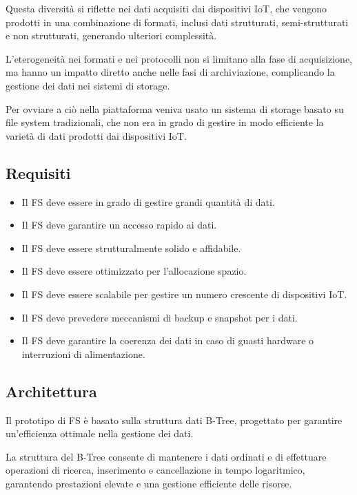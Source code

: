 \documentclass[12pt,a4paper,openright,twoside]{book}
\begin{document}
        Questa diversità si riflette nei dati acquisiti dai dispositivi \ac{IoT}, che vengono prodotti in una combinazione di formati, inclusi dati strutturati, semi-strutturati e non strutturati, generando ulteriori complessità.

        L'eterogeneità nei formati e nei protocolli non si limitano alla fase di acquisizione, ma hanno un impatto diretto anche nelle fasi di archiviazione, complicando la gestione dei dati nei sistemi di storage.

        Per ovviare a ciò nella piattaforma veniva usato un sistema di storage basato su file system tradizionali, che non era in grado di gestire in modo efficiente la varietà di dati prodotti dai dispositivi \ac{IoT}.

        \subsection{Requisiti}

            \begin{itemize}
                \item Il \ac{FS} deve essere in grado di gestire grandi quantità di dati.
                \item Il \ac{FS} deve garantire un accesso rapido ai dati.
                \item Il \ac{FS} deve essere strutturalmente solido e affidabile.
                \item Il \ac{FS} deve essere ottimizzato per l'allocazione spazio.
                \item Il \ac{FS} deve essere scalabile per gestire un numero crescente di dispositivi IoT.
                \item Il \ac{FS} deve prevedere meccanismi di backup e snapshot per i dati.
                \item Il \ac{FS} deve garantire la coerenza dei dati in caso di guasti hardware o interruzioni di alimentazione.
            \end{itemize}

        \subsection{Architettura}

            Il prototipo di \ac{FS} è basato sulla struttura dati B-Tree, progettato per garantire un'efficienza ottimale nella gestione dei dati.

            La struttura del B-Tree consente di mantenere i dati ordinati e di effettuare operazioni di ricerca, inserimento e cancellazione in tempo logaritmico, garantendo prestazioni elevate e una gestione efficiente delle risorse.
\end{document}
